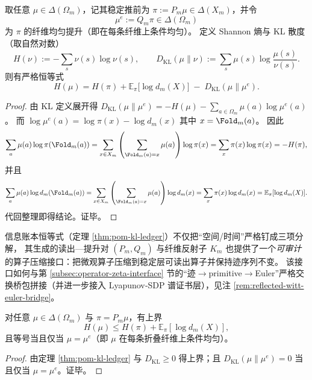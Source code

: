 \begin{theorem}\label{thm:pom-kl-ledger}
取任意 $\mu\in\Delta(\Omega_m)$，记其稳定推前为 $\pi:=P_m\mu\in\Delta(X_m)$，并令
\[
\mu^{e}:=Q_m\pi\in\Delta(\Omega_m)
\]
为 $\pi$ 的纤维均匀提升（即在每条纤维上条件均匀）。
定义 Shannon 熵与 KL 散度（取自然对数）
\[
H(\nu):=-\sum_{s}\nu(s)\log\nu(s),
\qquad
D_{\mathrm{KL}}(\mu\|\nu):=\sum_{s}\mu(s)\log\frac{\mu(s)}{\nu(s)}.
\]
则有严格恒等式
\[
\boxed{\;
H(\mu)=H(\pi)+\mathbb{E}_{\pi}\!\bigl[\log d_m(X)\bigr]\;-\;D_{\mathrm{KL}}(\mu\|\mu^{e}).
\;}
\]
\end{theorem}
\begin{proof}
由 KL 定义展开得
\(
D_{\mathrm{KL}}(\mu\|\mu^{e})=-H(\mu)-\sum_{a\in\Omega_m}\mu(a)\log\mu^{e}(a)
\)。
而
\(
\log\mu^{e}(a)=\log\pi(x)-\log d_m(x)
\)
其中 $x=\Fold_m(a)$。
因此
\[
\sum_{a}\mu(a)\log\pi(\Fold_m(a))
=\sum_{x\in X_m}\left(\sum_{\Fold_m(a)=x}\mu(a)\right)\log\pi(x)
=\sum_{x}\pi(x)\log\pi(x)
=-H(\pi),
\]
并且
\[
\sum_{a}\mu(a)\log d_m(\Fold_m(a))
=\sum_{x\in X_m}\left(\sum_{\Fold_m(a)=x}\mu(a)\right)\log d_m(x)
=\sum_{x}\pi(x)\log d_m(x)
=\mathbb{E}_{\pi}[\log d_m(X)].
\]
代回整理即得结论。证毕。
\end{proof}

\begin{remark}\label{rem:pom-ledger-glue-zeta}
信息账本恒等式（定理 \ref{thm:pom-kl-ledger}）不仅把“空间/时间”严格钉成三项分解，
其生成的读出—提升对 \((P_m,Q_m)\) 与纤维反射子 \(K_m\) 也提供了一个\emph{可审计}的算子压缩接口：把微观算子压缩到稳定层可读出算子并保持迹序列不变。
该接口如何与第 \ref{subsec:operator-zeta-interface} 节的“迹$\to$primitive$\to$Euler”严格交换桥包拼接（并进一步接入 Lyapunov‑SDP 谱证书层），见注 \ref{rem:reflected-witt-euler-bridge}。
\end{remark}

\begin{corollary}\label{cor:pom-kl-ledger-bound}
对任意 $\mu\in\Delta(\Omega_m)$ 与 $\pi=P_m\mu$，有上界
\[
H(\mu)\le H(\pi)+\mathbb{E}_{\pi}[\log d_m(X)],
\]
且等号当且仅当 $\mu=\mu^{e}$（即 $\mu$ 在每条折叠纤维上条件均匀）。
\end{corollary}
\begin{proof}
由定理 \ref{thm:pom-kl-ledger} 与 $D_{\mathrm{KL}}\ge 0$ 得上界；且 $D_{\mathrm{KL}}(\mu\|\mu^e)=0$ 当且仅当 $\mu=\mu^e$。证毕。
\end{proof}

